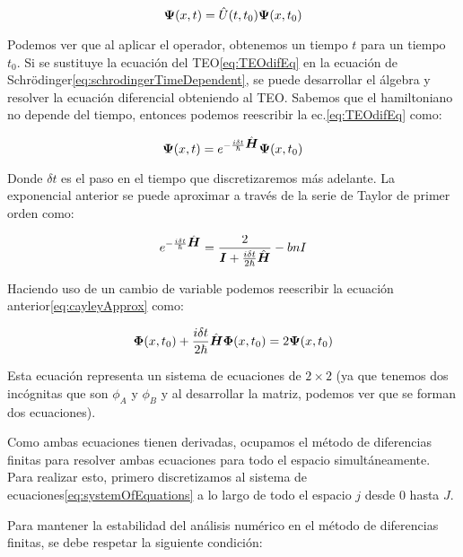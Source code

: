 \begin{equation}
    \label{eq:TEOdifEq}
    \mbox{\boldmath $\Psi$}(x,t)=\hat{U}(t,t_0)\mbox{\boldmath $\Psi$}(x,t_0)
\end{equation}

\noindent Podemos ver que al aplicar el operador, obtenemos un tiempo $t$ para un tiempo $t_0$.
Si se sustituye la ecuación del TEO\eqref{eq:TEOdifEq} en la ecuación de Schrödinger\eqref{eq:schrodingerTimeDependent}, se puede desarrollar el álgebra y resolver la ecuación diferencial obteniendo al TEO\@.
Sabemos que el hamiltoniano no depende del tiempo, entonces podemos reescribir la ec.\eqref{eq:TEOdifEq} como:

\begin{equation}
    \label{eq:TEOApplied}
    \mbox{\boldmath $\Psi$}(x,t)= e^{-\frac{i\delta t}{\hbar}\hat{\mbox{\boldmath $H$}}} \mbox{\boldmath $\Psi$}(x,t_0)
\end{equation}

\noindent Donde $\delta t$ es el paso en el tiempo que discretizaremos más adelante.
La exponencial anterior se puede aproximar a través de la serie de Taylor de primer orden como:

\begin{equation}
    \label{eq:cayleyApprox}
    e^{-\frac{i\delta t}{\hbar}\hat{\mbox{\boldmath $H$}}} = \frac{2}{\mbox{\boldmath $I$} + \frac{i\delta t}{2\hbar}\hat{\mbox{\boldmath $H$}}}-bn{I}
\end{equation}

Haciendo uso de un cambio de variable podemos reescribir la ecuación anterior\eqref{eq:cayleyApprox} como:

\begin{equation}
    \label{eq:systemOfEquations}
    \mbox{\boldmath $\Phi$}(x,t_0) + \frac{i\delta t}{2\hbar}\hat{\mbox{\boldmath $H$}}\mbox{\boldmath $\Phi$}(x,t_0)=2\mbox{\boldmath $\Psi$}(x,t_0)
\end{equation}

\noindent Esta ecuación representa un sistema de ecuaciones de $2\times2$ (ya que tenemos dos incógnitas que son $\phi_A$ y $\phi_B$ y al desarrollar la matriz, podemos ver que se forman dos ecuaciones).

Como ambas ecuaciones tienen derivadas, ocupamos el método de diferencias finitas para resolver ambas ecuaciones para todo el espacio simultáneamente.
Para realizar esto, primero discretizamos al sistema de ecuaciones\eqref{eq:systemOfEquations} a lo largo de todo el espacio $j$ desde $0$ hasta $J$.

Para mantener la estabilidad del análisis numérico en el método de diferencias finitas, se debe respetar la siguiente condición\cite{Carrillo2015}:

